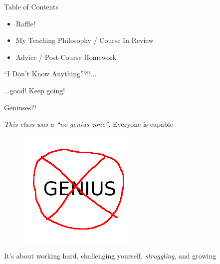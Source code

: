 \documentclass{beamer}
\begin{document}
\begin{frame}{Table of Contents}

\begin{itemize}[label=$\vartriangleright$]
	\item Raffle!
\end{itemize}

\begin{itemize}[label=$\vartriangleright$]
	\item My Teaching Philosophy / Course In Review
\end{itemize}


\begin{itemize}[label=$\blacktriangleright$]
	\item Advice / Post-Course Homework
\end{itemize}

\end{frame}


\begin{frame}{``I Don't Know Anything''?!!...}

...good!  Keep going!


\end{frame}


\begin{frame}{Geniuses?!}

{\em This class was a ``no genius zone''}.  Everyone is capable

\begin{figure}[t]
    \includegraphics[width=0.5\textwidth]{genius.png}
\end{figure}

It's about working hard, challenging yourself, {\em struggling}, and growing

\end{frame}
\end{document}

